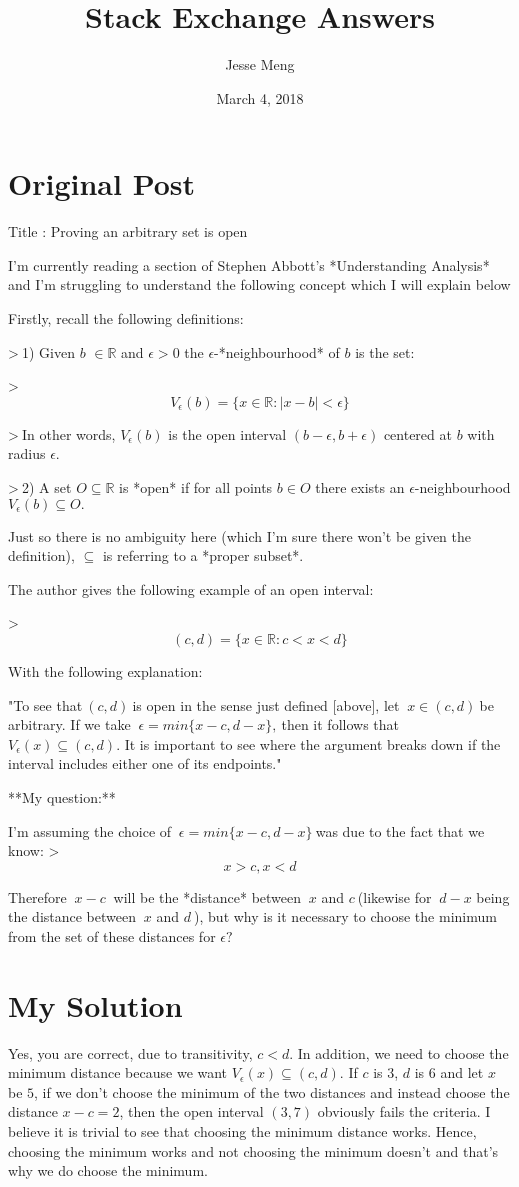 \documentclass{article}
\title{Stack Exchange Answers}
\author{Jesse Meng }
\date{March 4, 2018}
\begin{document}
\maketitle

\section{Original Post}
Title : Proving an arbitrary set is open

I'm currently reading a section of Stephen Abbott's *Understanding Analysis* and I'm struggling to understand the following concept which I will explain below 

Firstly, recall the following definitions:

>$\ $1) Given $b$ $\in\mathbb{R}$ and $\epsilon>0$ the $\epsilon$-*neighbourhood* of $b$ is the set:$ \ $

>$$V_{\epsilon}(b)=\{x\in\mathbb{R}:|x-b|<\epsilon\}$$

>$\ $In other words, $V_{\epsilon}(b)$ is the open interval $(b-\epsilon,b+\epsilon)$ centered at $b$ with radius $\epsilon.$

>$\ $2) A set $O\subseteq\mathbb{R}$ is *open* if for all points $b\in O$ there exists an $\epsilon$-neighbourhood $V_{\epsilon}(b)\subseteq O.$

Just so there is no ambiguity here (which I'm sure there won't be given the definition), $\subseteq$ is referring to a *proper subset*.

The author gives the following example of an open interval:

>$$(c,d)=\{x\in\mathbb{R}:c<x<d\}$$

With the following explanation:

"To see that$ \ (c,d)\ $is open in the sense just defined [above], let $ \ x\in(c,d) \ $be arbitrary. If we take $ \ \epsilon=min\{x-c,d-x\}, \ $then it follows that $V_{\epsilon}(x)\subseteq (c,d).$ It is important to see where the argument breaks down if the interval includes either one of its endpoints."

**My question:**


I'm assuming the choice of $ \ \epsilon=min\{x-c,d-x\} \ $was due to the fact that we know:
>$$x>c, x<d$$

Therefore $ \ x-c \ $ will be the *distance* between $ \ x $ and $ c \ $(likewise for $ \ d-x $ being the distance between $ \ x $ and $ d \ $), but why is it necessary to choose the minimum from the set of these distances for $ \epsilon? \ $
\section{My Solution}
Yes, you are correct, due to transitivity, $c < d$. In addition, we need to choose the minimum distance because we want $V_\epsilon(x)\subseteq(c,d)$. If $c$ is $3$, $d$ is $6$ and let $x$ be $5$, if we don't choose the minimum of the two distances and instead choose the distance $x-c=2$, then the open interval $(3,7)$ obviously fails the criteria. I believe it is trivial to see that choosing the minimum distance works. Hence, choosing the minimum works and not choosing the minimum doesn't and that's why we do choose the minimum.
\end{document}
